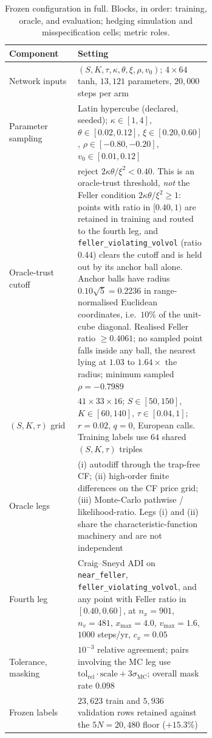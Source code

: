 \documentclass{article}
\begin{document}
\begin{table}[h]
\caption{Frozen configuration in full. Blocks, in order: training, oracle, and
evaluation; hedging simulation and misspecification cells; metric roles.}
\label{tab:configfull}
\centering\footnotesize\setlength{\tabcolsep}{4pt}
\begin{tabular}{@{}lp{0.66\linewidth}@{}}
\toprule
Component & Setting \\
\midrule
Network inputs & $(S, K, \tau, \kappa, \theta, \xi, \rho, v_0)$; $4\times64$ tanh, $13{,}121$ parameters, $20{,}000$ steps per arm \\
Parameter sampling & Latin hypercube (declared, seeded); $\kappa\in[1,4]$, $\theta\in[0.02,0.12]$, $\xi\in[0.20,0.60]$, $\rho\in[-0.80,-0.20]$, $v_0\in[0.01,0.12]$ \\
Oracle-trust cutoff & reject $2\kappa\theta/\xi^{2}<0.40$. This is an oracle-trust threshold, \emph{not} the Feller condition $2\kappa\theta/\xi^{2}\geq 1$: points with ratio in $[0.40,1)$ are retained in training and routed to the fourth leg, and \texttt{feller\_violating\_volvol} (ratio $0.44$) clears the cutoff and is held out by its anchor ball alone. Anchor balls have radius $0.10\sqrt{5}=0.2236$ in range-normalised Euclidean coordinates, i.e.\ $10\%$ of the unit-cube diagonal. Realised Feller ratio $\geq 0.4061$; no sampled point falls inside any ball, the nearest lying at $1.03$ to $1.64\times$ the radius; minimum sampled $\rho = -0.7989$ \\
$(S,K,\tau)$ grid & $41\times33\times16$; $S\in[50,150]$, $K\in[60,140]$, $\tau\in[0.04,1]$; $r=0.02$, $q=0$, European calls. Training labels use $64$ shared $(S,K,\tau)$ triples \\
Oracle legs & (i) autodiff through the trap-free CF; (ii) high-order finite differences on the CF price grid; (iii) Monte-Carlo pathwise / likelihood-ratio. Legs (i) and (ii) share the characteristic-function machinery and are not independent \\
Fourth leg & Craig--Sneyd ADI on \texttt{near\_feller}, \texttt{feller\_violating\_volvol}, and any point with Feller ratio in $[0.40,0.60]$, at $n_x{=}901$, $n_v{=}481$, $x_{\max}{=}4.0$, $v_{\max}{=}1.6$, $1000$ steps/yr, $c_x{=}0.05$ \\
Tolerance, masking & $10^{-3}$ relative agreement; pairs involving the MC leg use $\mathrm{tol_{rel}}\cdot\mathrm{scale} + 3\sigma_{\mathrm{MC}}$; overall mask rate $0.098$ \\
Frozen labels & $23{,}623$ train and $5{,}936$ validation rows retained against the $5N = 20{,}480$ floor ($+15.3\%$) \\

\end{tabular}
\end{table}
\end{document}
